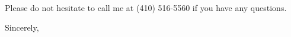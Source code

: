 \begin{letter}

Please do not hesitate to call me at (410) 516-5560 if you have any questions.

\closing{Sincerely,}
\end{letter}


